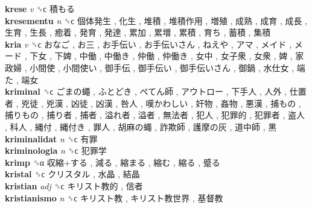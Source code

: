 \textbf{krese} \emph{v}  ␝ϲ   積もる   \\
\textbf{kresementu} \emph{n}  ␝ϲ   個体発生 ,  化生 ,  堆積 ,  堆積作用 ,  増殖 ,  成熟 ,  成育 ,  成長 ,  生育 ,  生長 ,  癒着 ,  発育 ,  発達 ,  累加 ,  累増 ,  累積 ,  育ち ,  蓄積 ,  集積   \\
\textbf{kria} \emph{v}  ␝ϲ   おなご ,  お三 ,  お手伝い ,  お手伝いさん ,  ねえや ,  アマ ,  メイド ,  メード ,  下女 ,  下婢 ,  中働 ,  中働き ,  仲働 ,  仲働き ,  女中 ,  女子衆 ,  女衆 ,  婢 ,  家政婦 ,  小間使 ,  小間使い ,  御手伝 ,  御手伝い ,  御手伝いさん ,  御鍋 ,  水仕女 ,  端た ,  端女   \\
\textbf{kriminal} ␝ϲ   ごまの蠅 ,  ふとどき ,  ぺてん師 ,  アウトロー ,  下手人 ,  人外 ,  仕置者 ,  兇徒 ,  兇漢 ,  凶徒 ,  凶漢 ,  咎人 ,  嘆かわしい ,  奸物 ,  姦物 ,  悪漢 ,  捕もの ,  捕りもの ,  捕り者 ,  捕者 ,  溢れ者 ,  溢者 ,  無法者 ,  犯人 ,  犯罪的 ,  犯罪者 ,  盗人 ,  科人 ,  縄付 ,  縄付き ,  罪人 ,  胡麻の蠅 ,  詐欺師 ,  護摩の灰 ,  道中師 ,  黒   \\
\textbf{kriminalidat} \emph{n}  ␝ϲ   有罪   \\
\textbf{kriminologia} \emph{n}  ␝ϲ   犯罪学   \\
\textbf{krimp} ␝α   収縮+する ,  減る ,  縮まる ,  縮む ,  縮る ,  蹙る   \\
\textbf{kristal} ␝ϲ   クリスタル ,  水晶 ,  結晶   \\
\textbf{kristian} \emph{adj}  ␝ϲ   キリスト教的 ,  信者   \\
\textbf{kristianismo} \emph{n}  ␝ϲ   キリスト教 ,  キリスト教世界 ,  基督教   \\
